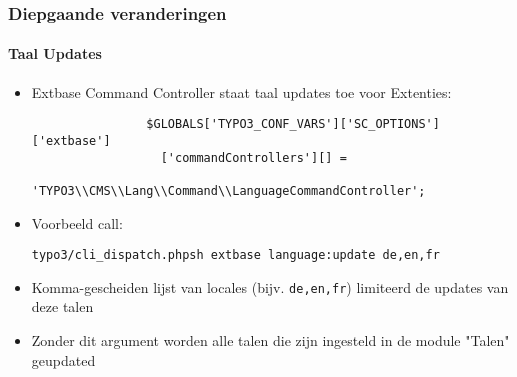 
\begin{frame}[fragile]
	\frametitle{Diepgaande veranderingen}
	\framesubtitle{Taal Updates}

	\begin{itemize}
		\item Extbase Command Controller staat taal updates toe voor Extenties:

			\begin{lstlisting}
				$GLOBALS['TYPO3_CONF_VARS']['SC_OPTIONS']['extbase']
				  ['commandControllers'][] =
				  'TYPO3\\CMS\\Lang\\Command\\LanguageCommandController';
			\end{lstlisting}

		\item Voorbeeld call:

			\lstinline!typo3/cli_dispatch.phpsh extbase language:update de,en,fr!

		\item Komma-gescheiden lijst van locales (bijv. \texttt{de,en,fr}) limiteerd de updates van deze talen
		\item Zonder dit argument worden alle talen die zijn ingesteld in de module "Talen" geupdated

	\end{itemize}

\end{frame}


